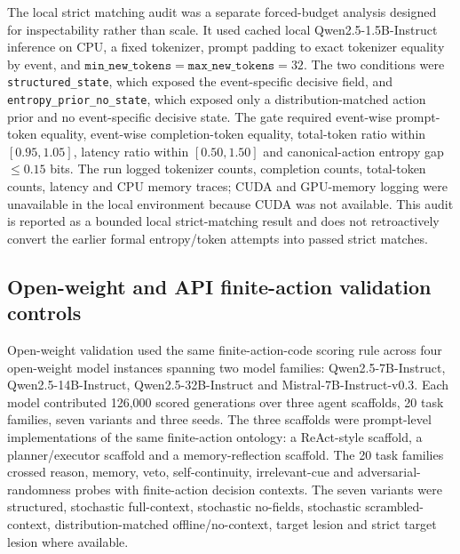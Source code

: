 ﻿\documentclass[preprint,12pt,authoryear]{elsarticle}
\begin{document}
The local strict matching audit was a separate forced-budget analysis designed for inspectability rather than scale. It used cached local Qwen2.5-1.5B-Instruct inference on CPU, a fixed tokenizer, prompt padding to exact tokenizer equality by event, and \(\texttt{min\_new\_tokens}=\texttt{max\_new\_tokens}=32\). The two conditions were \texttt{structured\_state}, which exposed the event-specific decisive field, and \texttt{entropy\_prior\_no\_state}, which exposed only a distribution-matched action prior and no event-specific decisive state. The gate required event-wise prompt-token equality, event-wise completion-token equality, total-token ratio within \([0.95,1.05]\), latency ratio within \([0.50,1.50]\) and canonical-action entropy gap \(\leq0.15\) bits. The run logged tokenizer counts, completion counts, total-token counts, latency and CPU memory traces; CUDA and GPU-memory logging were unavailable in the local environment because CUDA was not available. This audit is reported as a bounded local strict-matching result and does not retroactively convert the earlier formal entropy/token attempts into passed strict matches.

\subsection{Open-weight and API finite-action validation controls}

Open-weight validation used the same finite-action-code scoring rule across four open-weight model instances spanning two model families: Qwen2.5-7B-Instruct, Qwen2.5-14B-Instruct, Qwen2.5-32B-Instruct and Mistral-7B-Instruct-v0.3. Each model contributed 126,000 scored generations over three agent scaffolds, 20 task families, seven variants and three seeds. The three scaffolds were prompt-level implementations of the same finite-action ontology: a ReAct-style scaffold, a planner/executor scaffold and a memory-reflection scaffold. The 20 task families crossed reason, memory, veto, self-continuity, irrelevant-cue and adversarial-randomness probes with finite-action decision contexts. The seven variants were structured, stochastic full-context, stochastic no-fields, stochastic scrambled-context, distribution-matched offline/no-context, target lesion and strict target lesion where available.
\end{document}
